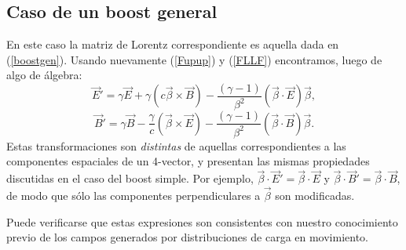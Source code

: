 \subsection{Caso de un boost general}
En este caso la matriz de Lorentz correspondiente es aquella dada en
(\ref{boostgen}). Usando nuevamente (\ref{Fupup}) y (\ref{FLLF}) encontramos, luego de algo de álgebra:
\begin{equation}
\boxed{\vec{E}'=\gamma \vec{E}+\gamma \left(c\vec{\beta}\times
\vec{B}\right) -\frac{(\gamma -1)}{\beta^2}\left( \vec{\beta}\cdot
\vec{E}\right) \vec{\beta} ,} \label{TLE}
\end{equation}
\begin{equation}
\boxed{\vec{B}'=\gamma \vec{B}-\frac{\gamma}{c} \left(\vec{\beta}\times
\vec{E}\right) -\frac{(\gamma -1)}{\beta^2}\left( \vec{\beta}\cdot
\vec{B}\right) \vec{\beta}.} \label{TLB}
\end{equation}
Estas transformaciones son \textit{distintas} de aquellas correspondientes a las componentes espaciales de un 4-vector, y presentan las mismas propiedades
discutidas en el caso del boost simple. Por ejemplo,
$\vec{\beta}\cdot\vec{E}'=\vec{\beta}\cdot\vec{E}$ y
$\vec{\beta}\cdot\vec{B}'=\vec{\beta}\cdot\vec{B}$, de modo que sólo las
componentes perpendiculares a $\vec{\beta}$ son modificadas.

Puede verificarse que estas expresiones son consistentes con nuestro conocimiento previo de los campos generados por distribuciones de carga en movimiento.

